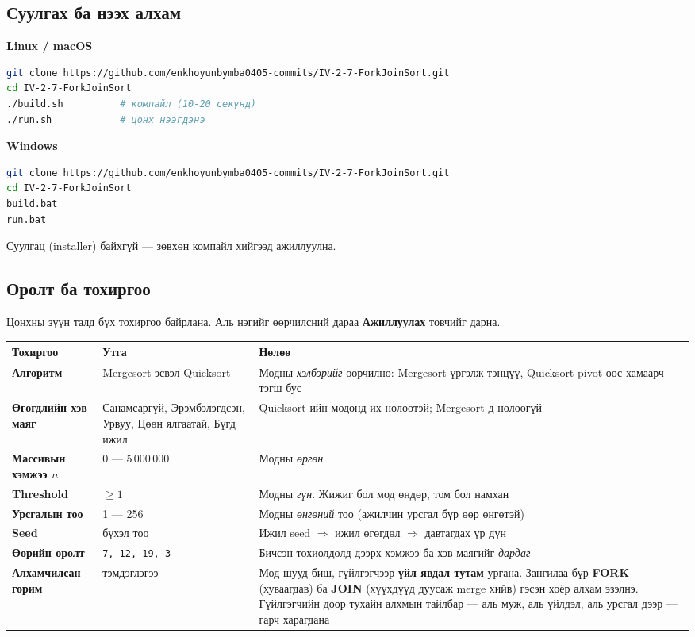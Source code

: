\documentclass[11pt,a4paper]{article}
\begin{document}
\subsection{Суулгах ба нээх алхам}

\textbf{Linux / macOS}
\begin{lstlisting}[language=bash]
git clone https://github.com/enkhoyunbymba0405-commits/IV-2-7-ForkJoinSort.git
cd IV-2-7-ForkJoinSort
./build.sh          # компайл (10-20 секунд)
./run.sh            # цонх нээгдэнэ
\end{lstlisting}

\textbf{Windows}
\begin{lstlisting}[language=bash]
git clone https://github.com/enkhoyunbymba0405-commits/IV-2-7-ForkJoinSort.git
cd IV-2-7-ForkJoinSort
build.bat
run.bat
\end{lstlisting}

Суулгац (installer) байхгүй --- зөвхөн компайл хийгээд ажиллуулна.

\subsection{Оролт ба тохиргоо}
Цонхны зүүн талд бүх тохиргоо байрлана. Аль нэгийг өөрчилсний дараа
\textbf{Ажиллуулах} товчийг дарна.

\begin{center}
\small
\begin{tabular}{L{3.4cm}L{5.0cm}L{6.0cm}}
\toprule
Тохиргоо & Утга & Нөлөө \\
\midrule
\textbf{Алгоритм} & Mergesort эсвэл Quicksort &
Модны \emph{хэлбэрийг} өөрчилнө: Mergesort үргэлж тэнцүү, Quicksort
pivot-оос хамаарч тэгш бус \\
\textbf{Өгөгдлийн хэв маяг} & Санамсаргүй, Эрэмбэлэгдсэн, Урвуу,
Цөөн ялгаатай, Бүгд ижил &
Quicksort-ийн модонд их нөлөөтэй; Mergesort-д нөлөөгүй \\
\textbf{Массивын хэмжээ $n$} & 0 --- 5\,000\,000 &
Модны \emph{өргөн} \\
\textbf{Threshold} & $\ge 1$ &
Модны \emph{гүн}. Жижиг бол мод өндөр, том бол намхан \\
\textbf{Урсгалын тоо} & 1 --- 256 &
Модны \emph{өнгөний} тоо (ажилчин урсгал бүр өөр өнгөтэй) \\
\textbf{Seed} & бүхэл тоо &
Ижил seed $\Rightarrow$ ижил өгөгдөл $\Rightarrow$ давтагдах үр дүн \\
\textbf{Өөрийн оролт} & \texttt{7, 12, 19, 3} &
Бичсэн тохиолдолд дээрх хэмжээ ба хэв маягийг \emph{дардаг} \\
\textbf{Алхамчилсан горим} & тэмдэглэгээ &
Мод шууд биш, гүйлгэгчээр \textbf{үйл явдал тутам} ургана. Зангилаа бүр
\textbf{FORK} (хуваагдав) ба \textbf{JOIN} (хүүхдүүд дуусаж merge хийв) гэсэн
хоёр алхам эзэлнэ. Гүйлгэгчийн доор тухайн алхмын тайлбар --- аль муж, аль
үйлдэл, аль урсгал дээр --- гарч харагдана \\
\bottomrule
\end{tabular}
\end{center}
\end{document}
